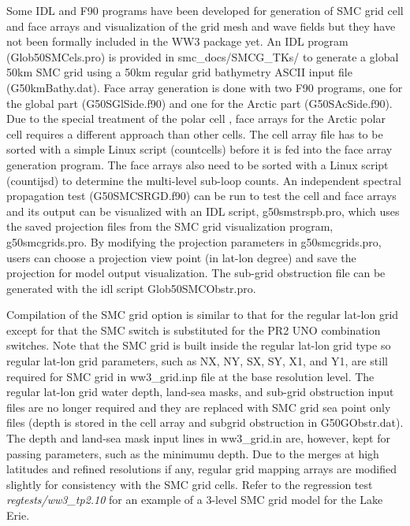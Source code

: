 Some IDL and F90 programs have been developed for generation of SMC grid cell
and face arrays and visualization of the grid mesh and wave fields but they
have not been formally included in the WW3 package yet. An IDL program 
(Glob50SMCels.pro) is provided in smc\_docs/SMCG\_TKs/ to generate a global 50km 
SMC grid using a 50km regular grid bathymetry ASCII input file (G50kmBathy.dat). 
Face array generation is done with two F90 programs, one for the global part 
(G50SGlSide.f90) and one for the Arctic part (G50SAcSide.f90).  Due to the special 
treatment of the polar cell \citep{art:Li12}, face arrays for the Arctic polar cell 
requires a different approach than other cells. The cell array file has to be 
sorted with a simple Linux script (countcells) before it is fed into the face array 
generation program.  The face arrays also need to be sorted with a Linux script 
(countijsd) to determine the multi-level sub-loop counts.  An independent spectral 
propagation test (G50SMCSRGD.f90) can be run to test the cell and face arrays and 
its output can be visualized with an IDL script, g50smstrspb.pro, which uses the 
saved projection files from the SMC grid visualization program, g50smcgrids.pro. 
By modifying the projection parameters in g50smcgrids.pro, users can choose a 
projection view point (in lat-lon degree) and save the projection for model 
output visualization.  The sub-grid obstruction file can be generated with the 
idl script Glob50SMCObstr.pro.

Compilation of the SMC grid option is similar to that for the regular
lat-lon grid except for that the SMC switch is substituted for the
PR2 UNO combination switches. Note that the SMC grid is built inside
the regular lat-lon grid type so regular lat-lon grid parameters,
such as NX, NY, SX, SY, X1, and Y1, are still required for SMC grid
in ww3\_grid.inp file at the base resolution level. The regular lat-lon
grid water depth, land-sea masks, and sub-grid obstruction input files
are no longer required and they are replaced with SMC grid sea point only 
files (depth is stored in the cell array and subgrid obstruction in 
G50GObstr.dat).  The depth and land-sea mask input lines in ww3\_grid.in 
are, however, kept for passing parameters, such as the minimumu depth.
Due to the merges at high latitudes and refined resolutions if any,
regular grid mapping arrays are modified slightly for consistency
with the SMC grid cells. 
Refer to the regression test \emph{regtests/ww3\_tp2.10}
for an example of a 3-level SMC grid model for the Lake Erie.

